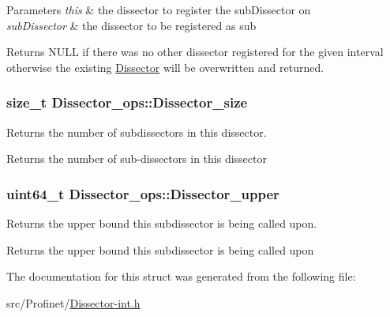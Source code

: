\begin{DoxyParams}{Parameters}
{\em this} & the dissector to register the sub\-Dissector on \\
\hline
{\em sub\-Dissector} & the dissector to be registered as sub\\
\hline
\end{DoxyParams}
\begin{DoxyReturn}{Returns}
N\-U\-L\-L if there was no other dissector registered for the given interval otherwise the existing \hyperlink{struct_dissector}{Dissector} will be overwritten and returned. 
\end{DoxyReturn}
\hypertarget{struct_dissector__ops_a8982a0368e988bc9cb93ee83d5411b99}{
\subsubsection[{Dissector\-\_\-size}]{\setlength{\rightskip}{0pt plus 5cm}size\-\_\-t Dissector\-\_\-ops\-::\-Dissector\-\_\-size}}\label{struct_dissector__ops_a8982a0368e988bc9cb93ee83d5411b99}


Returns the number of subdissectors in this dissector. 

\begin{DoxyReturn}{Returns}
the number of sub-\/dissectors in this dissector 
\end{DoxyReturn}
\hypertarget{struct_dissector__ops_a3d9e177f508734b6136538e051b64699}{
\subsubsection[{Dissector\-\_\-upper}]{\setlength{\rightskip}{0pt plus 5cm}uint64\-\_\-t Dissector\-\_\-ops\-::\-Dissector\-\_\-upper}}\label{struct_dissector__ops_a3d9e177f508734b6136538e051b64699}


Returns the upper bound this subdissector is being called upon. 

\begin{DoxyReturn}{Returns}
the upper bound this subdissector is being called upon 
\end{DoxyReturn}


The documentation for this struct was generated from the following file\-:\begin{DoxyCompactItemize}
\item 
src/\-Profinet/\hyperlink{_dissector-int_8h}{Dissector-\/int.\-h}\end{DoxyCompactItemize}
